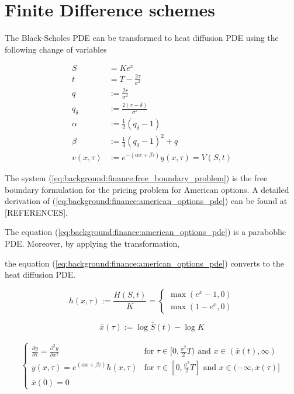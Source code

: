 
\section{Finite Difference schemes}

The Black-Scholes PDE can be transformed to heat diffusion PDE using the following
change of variables

\begin{align*}
  S &= Ke^x \\
  t &= T - \frac{2\tau}{\sigma^2} \\ 
  q &:= \frac{2r}{\sigma^2} \\
  q_{\delta} &:= \frac{2(r-\delta)}{\sigma^2} \\
  \alpha &:= \frac{1}{2}(q_{\delta} - 1) \\
  \beta &:= \frac{1}{4}(q_{\delta} - 1)^2 + q \\
  v(x, \tau) &:= e^{-(\alpha x + \beta \tau)}y(x, \tau)= V(S, t)
\end{align*}

The system (\ref{eq:background:finance:free_boundary_problem}) 
is the free boundary formulation for the pricing problem for American options.
A detailed derivation of (\ref{eq:background:finance:american_options_pde}) 
can be found at [REFERENCES].


The equation (\ref*{eq:background:finance:american_options_pde}) 
is a paraboblic PDE. Moreover, by applying the transformation,


the equation (\ref*{eq:background:finance:american_options_pde}) converts 
to the heat diffusion PDE.

\begin{equation}
  h(x, \tau) := \frac{H(S, t)}{K} = \begin{cases}
    \max(e^{x} - 1, 0)\\
    \max(1 - e^{x}, 0)
  \end{cases} 
\end{equation}

\begin{equation}
  \bar{x}(\tau) := \log{\bar{S}(t)} - \log{K} 
\end{equation}

\begin{align}
  \begin{cases}
    \frac{\partial y}{\partial \tau} = \frac{\partial^2 y}{\partial x^2} & \text{for $\tau\in[0,\frac{\sigma^2}{2}T)$ and $x\in(\bar{x}(t), \infty)$} \\
    y(x, \tau) = e^{(\alpha x + \beta \tau)}h(x, \tau) & \text{for $\tau\in[0, \frac{\sigma^2}{2}T]$ and $x\in(-\infty, \bar{x}(\tau)]$} \\
    \bar{x}(0) = 0
  \end{cases}
  \label{eq:background:finance:american_option_heat_equation}
\end{align}

